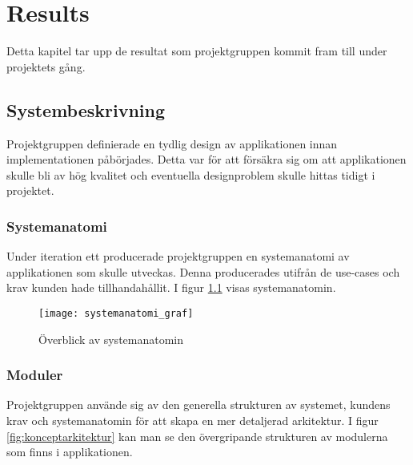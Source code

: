 
\chapter{Results}
\label{cha:results}

Detta kapitel tar upp de resultat som projektgruppen kommit fram till under projektets gång.

\section{Systembeskrivning}

Projektgruppen definierade en tydlig design av applikationen innan implementationen påbörjades. Detta var för att försäkra sig om att applikationen skulle bli av hög kvalitet och eventuella designproblem skulle hittas tidigt i projektet.

\subsection{Systemanatomi}
Under iteration ett producerade projektgruppen en systemanatomi av applikationen som skulle utveckas. Denna producerades utifrån de use-cases och krav kunden hade tillhandahållit. I figur \ref{fig:systemanatomi_graf} visas systemanatomin.

\begin{figure}[h]
    \centering
    \texttt{[image: systemanatomi\_graf]}
    \caption{Överblick av systemanatomin}
    \label{fig:systemanatomi_graf}
\end{figure}

\pagebreak

\subsection{Moduler}
Projektgruppen använde sig av den generella strukturen av systemet, kundens krav och systemanatomin för att skapa en mer detaljerad arkitektur. I figur \ref{fig:konceptarkitektur} kan man se den övergripande strukturen av modulerna som finns i applikationen.

